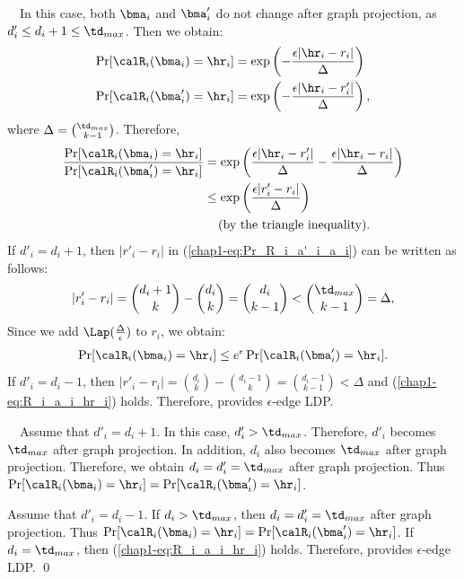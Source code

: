 \smallskip
{}~~In this case, both $\bma_i$ and $\bma'_i$ do not change after graph projection, as $d'_i \leq d_i + 1 \leq \td_{max}$. 
Then we obtain:
\begin{align*}
\Pr[\calR_i(\bma_i) = \hr_i] &= \exp\left(-\frac{\epsilon |\hr_i- r_i|}{\Delta}\right) \\
\Pr[\calR_i(\bma'_i) = \hr_i] &= \exp\left(-\frac{\epsilon |\hr_i- r'_i|}{\Delta}\right),
\end{align*}
where $\Delta = \binom{\td_{max}}{k-1}$. 
Therefore, 
\begin{align}
\frac{\Pr[\calR_i(\bma_i) = \hr_i]}{\Pr[\calR_i(\bma'_i) = \hr_i]} 
&= \exp\left( \frac{\epsilon |\hr_i- r'_i|}{\Delta} - \frac{\epsilon |\hr_i- r_i|}{\Delta}\right) \nonumber\\
&\leq  \exp\left( \frac{\epsilon |r'_i- r_i|}{\Delta} \right) \label{chap1-eq:Pr_R_i_a'_i_a_i}\\
& \hspace{4mm} (\text{by the triangle inequality}). \nonumber
\end{align}
If $d'_i = d_i + 1$, then $|r'_i- r_i|$ in (\ref{chap1-eq:Pr_R_i_a'_i_a_i}) can be written as follows:
\begin{align*}
|r'_i- r_i| 
= \binom{d_i+1}{k} - \binom{d_i}{k} 
= \binom{d_i}{k-1}
< \binom{\td_{max}}{k-1}
= \Delta, 
\end{align*}
Since we add $\Lap(\frac{\Delta}{\epsilon})$ to $r_i$, we obtain:
\begin{align}
\Pr[\calR_i(\bma_i) = \hr_i] \leq e^\epsilon \Pr[\calR_i(\bma'_i) = \hr_i]. 
\label{chap1-eq:R_i_a_i_hr_i}
\end{align}
If $d'_i = d_i - 1$, then $|r'_i- r_i| = \binom{d_i}{k} - \binom{d_i-1}{k} = \binom{d_i-1}{k-1} < \Delta$ and (\ref{chap1-eq:R_i_a_i_hr_i}) holds. 
Therefore,  provides $\epsilon$-edge LDP. 

\smallskip
{}~~Assume 
that $d'_i = d_i + 1$. 
In this case, $d'_i > \td_{max}$. 
Therefore, $d'_i$ becomes $\td_{max}$ after graph projection. 
In addition, 
$d_i$ also becomes $\td_{max}$ after graph projection. 
Therefore, we obtain 
$d_i = d'_i = \td_{max}$ after graph projection. 
Thus 
$\Pr[\calR_i(\bma_i) = \hr_i] = \Pr[\calR_i(\bma'_i) = \hr_i]$. 

Assume that $d'_i = d_i - 1$. 
If $d_i > \td_{max}$, then $d_i = d'_i = \td_{max}$ after graph projection. 
Thus $\Pr[\calR_i(\bma_i) = \hr_i] = \Pr[\calR_i(\bma'_i) = \hr_i]$. 
If $d_i = \td_{max}$, then (\ref{chap1-eq:R_i_a_i_hr_i}) holds. 
Therefore,  provides $\epsilon$-edge LDP. \qed

